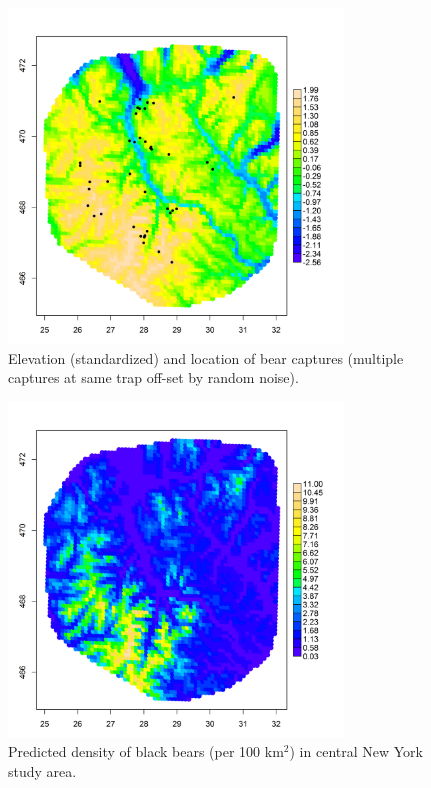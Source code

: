 \documentclass[12pt]{article}
\begin{document}
\begin{figure}
\centering
\includegraphics[width=3.5in,height=3.5in]{figs/elev_captures.png}
\caption{Elevation (standardized) and location of bear captures
  (multiple captures at same trap off-set by random noise).
}
\label{fig.elevation}
\end{figure}


\begin{figure}
\centering
\includegraphics[width=3.5in,height=3.5in]{figs/density.png}
\caption{Predicted density of black bears (per 100 km$^2$) in central New York study
  area.
}
\label{fig.density}
\end{figure}
\end{document}
